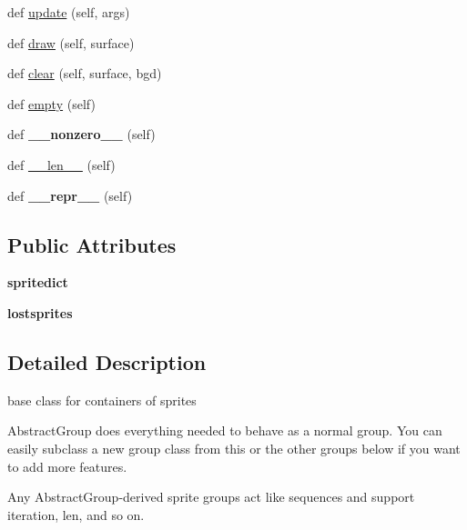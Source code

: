 \begin{DoxyCompactItemize}
\item 
def \hyperlink{classpygame_1_1sprite_1_1_abstract_group_a945ba48cfeeaef0d9b56e07fbe9f9b98}{update} (self, args)
\item 
def \hyperlink{classpygame_1_1sprite_1_1_abstract_group_a67c4d4f27e68ab337d9d475a515add96}{draw} (self, surface)
\item 
def \hyperlink{classpygame_1_1sprite_1_1_abstract_group_ae1f83a49c71eb4267e7ec6fb4f053f2b}{clear} (self, surface, bgd)
\item 
def \hyperlink{classpygame_1_1sprite_1_1_abstract_group_aad20dee3285d782816bfa1b20c56037b}{empty} (self)
\item 
\mbox{\label{classpygame_1_1sprite_1_1_abstract_group_a98bd77d56f05a07d97b95d379d767288}} 
def {\bfseries \+\_\+\+\_\+nonzero\+\_\+\+\_\+} (self)
\item 
def \hyperlink{classpygame_1_1sprite_1_1_abstract_group_a066b8c25c61ec2e72d8a7e44c7d64922}{\+\_\+\+\_\+len\+\_\+\+\_\+} (self)
\item 
\mbox{\label{classpygame_1_1sprite_1_1_abstract_group_a77424bc3c531608dcc38a3e87d795e73}} 
def {\bfseries \+\_\+\+\_\+repr\+\_\+\+\_\+} (self)
\end{DoxyCompactItemize}
\subsection*{Public Attributes}
\begin{DoxyCompactItemize}
\item 
\mbox{\label{classpygame_1_1sprite_1_1_abstract_group_a460d8a481b58965552ae3817deb502bf}} 
{\bfseries spritedict}
\item 
\mbox{\label{classpygame_1_1sprite_1_1_abstract_group_a0c595ab14cb411c25f0aecddd783053f}} 
{\bfseries lostsprites}
\end{DoxyCompactItemize}


\subsection{Detailed Description}
\begin{DoxyVerb}base class for containers of sprites

AbstractGroup does everything needed to behave as a normal group. You can
easily subclass a new group class from this or the other groups below if
you want to add more features.

Any AbstractGroup-derived sprite groups act like sequences and support
iteration, len, and so on.\end{DoxyVerb}
 

